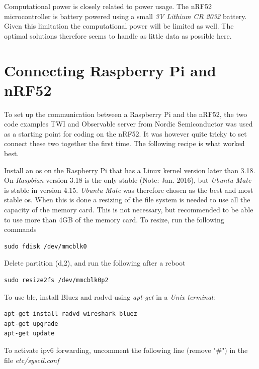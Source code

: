 Computational power is closely related to power usage. The nRF52 microcontroller is battery powered using a small \textit{3V Lithium CR 2032} battery. Given this limitation the computational power will be limited as well. The optimal solutions therefore seems to handle as little data as possible here. 


\section{Connecting Raspberry Pi and nRF52}



To set up the communication between a Raspberry Pi and the nRF52, the two code examples TWI and Observable server from Nordic Semiconductor was used as a starting point for coding on the nRF52. It was however quite tricky to set connect these two together the first time. The following recipe is what worked best. 

Install an \gls{os} on the Raspberry Pi that has a Linux kernel version later than 3.18. On \textit{Raspbian} version 3.18 is the only stable (Note: Jan. 2016), but \textit{Ubuntu Mate} is stable in version 4.15. \textit{Ubuntu Mate} was therefore chosen as the best and most stable \gls{os}. When this is done a resizing of the file system is needed to use all the capacity of the memory card. This is not necessary, but recommended to be able to use more than 4GB of the memory card. To resize, run the following commands

\begin{verbatim}
sudo fdisk /dev/mmcblk0
\end{verbatim}

Delete partition (d,2), and run the following after a reboot

\begin{verbatim}
sudo resize2fs /dev/mmcblk0p2
\end{verbatim}

To use \gls{ble}, install Bluez and radvd using \textit{apt-get} in a \textit{Unix terminal}:

\begin{verbatim}
apt-get install radvd wireshark bluez
apt-get upgrade
apt-get update
\end{verbatim}

To activate \gls{ipv6} forwarding, uncomment the following line (remove "\#") in the file \textit{etc/sysctl.conf}


